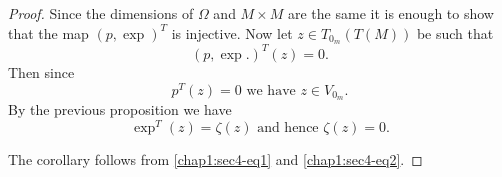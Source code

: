 \begin{proof}
Since the dimensions of $\Omega$ and $M\times M$ are the same it is
enough to show that the map $(p,\exp)^{T}$ is injective. Now let $z\in
T_{0_{m}}(T(M))$ be such that
$$
(p,\exp.)^{T}(z)=0.
$$
Then since
\begin{equation*}
p^{T}(z)=0\text{ we have } z\in V_{0_{m}}.\tag{1}\label{chap1:sec4-eq1}
\end{equation*}
By the previous proposition we have
\begin{equation*}
\exp^{T}(z)=\zeta(z)\text{ and hence } \zeta(z)=0.\tag{2}\label{chap1:sec4-eq2}
\end{equation*}

The corollary follows from \eqref{chap1:sec4-eq1} and \eqref{chap1:sec4-eq2}.
\end{proof}

